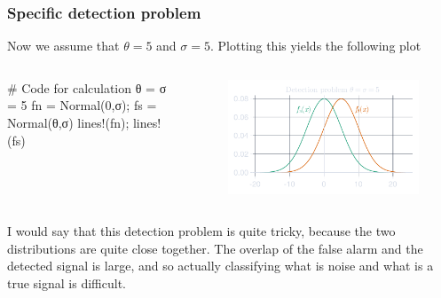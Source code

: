 \documentclass[compress]{beamer}
\begin{document}
\begin{frame}[fragile] %
    \frametitle{Specific detection problem}
    Now we assume that $\theta = 5$ and $\sigma = 5$. Plotting this yields the 
    following plot
    \begin{columns}
        \begin{column}{0.5\textwidth}
            \begin{jllisting}[gobble=16]
                # Code for calculation
                θ = σ = 5
                fn = Normal(0,σ); fs = Normal(θ,σ)
                lines!(fn); lines!(fs)
            \end{jllisting}
        \end{column}
        \begin{column}{0.5\textwidth}
            \begin{figure}
                \includegraphics[width=\columnwidth]{"../b.pdf"}
            \end{figure}
        \end{column}
    \end{columns}
    I would say that this detection problem is quite tricky, because the two
    distributions are quite close together. The overlap of the false alarm and
    the detected signal is large, and so actually classifying what is noise
    and what is a true signal is difficult.
\end{frame} 
\end{document}
